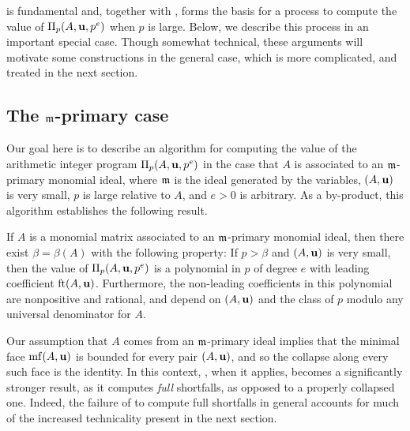 \documentclass[11pt]{amsart}
\begin{document}
 is fundamental and, together with , forms the basis for a process to compute the value of $\Pi_p(A, \mathbf{u}, p^e)$ when $p$ is large.  Below, we describe this process in an important special case.  Though somewhat technical, these arguments will motivate some constructions in the general case, which is more complicated, and treated in the next section.

\subsection{The $\mathfrak{m}$-primary case}
\label{m-primary: SS}
  Our goal here is to describe an algorithm for computing the value of the arithmetic integer program $\Pi_p(A,\mathbf{u}, p^e)$ in the case that $A$ is associated to an $\mathfrak{m}$-primary monomial ideal, where $\mathfrak{m}$ is the ideal generated by the variables, $(A,\mathbf{u})$ is very small, $p$ is large relative to $A$, and $e > 0$ is arbitrary.  As a by-product, this algorithm  establishes the following result.

\begin{theorem}
   \label{m-primary AIP: T}
   If $A$ is a monomial matrix associated to an $\mathfrak{m}$-primary monomial ideal, then there exist $\beta=\beta(A)$ with the following property\textup:
   If $p > \beta$ and $(A,\mathbf{u})$ is very small, then the value of $\Pi_p(A,\mathbf{u},p^e)$ is a polynomial in $p$ of degree $e$ with leading coefficient $\operatorname{ft}(A, \mathbf{u})$.
   Furthermore, the non-leading coefficients in this polynomial are nonpositive and rational, and depend on $(A,\mathbf{u})$ and the class of $p$ modulo any universal denominator for $A$.
\end{theorem}

Our assumption that $A$ comes from an $\mathfrak{m}$-primary ideal implies that the minimal face $\operatorname{mf}(A, \mathbf{u})$ is bounded for every pair $(A, \mathbf{u})$, and so the collapse along every such face is the identity.
In this context, , when it applies, becomes a significantly stronger result, as it computes \emph{full} shortfalls, as opposed to a properly collapsed one.
Indeed, the failure of  to compute full shortfalls in general accounts for much of the increased technicality present in the next section.
\end{document}
